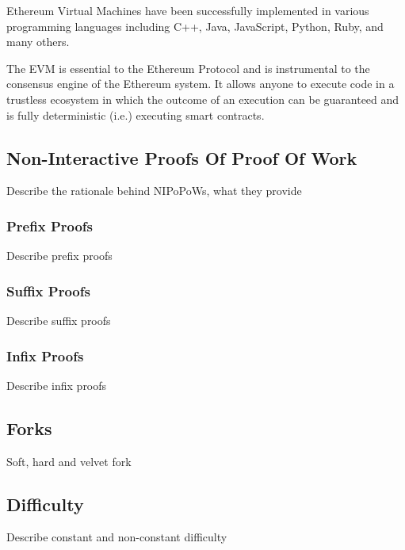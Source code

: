 Ethereum Virtual Machines have been successfully implemented in
various programming languages including C++, Java, JavaScript, Python,
Ruby, and many others.

The EVM is essential to the Ethereum Protocol and is instrumental to
the consensus engine of the Ethereum system. It allows anyone to
execute code in a trustless ecosystem in which the outcome of an
execution can be guaranteed and is fully deterministic (i.e.)
executing smart contracts.

\subsection{Non-Interactive Proofs Of Proof Of Work}

Describe the rationale behind NIPoPoWs, what they provide

\subsubsection{Prefix Proofs}

Describe prefix proofs

\subsubsection{Suffix Proofs}

Describe suffix proofs

\subsubsection{Infix Proofs}

Describe infix proofs

\subsection{Forks}

Soft, hard and velvet fork

\subsection{Difficulty}

Describe constant and non-constant difficulty

\pagebreak

